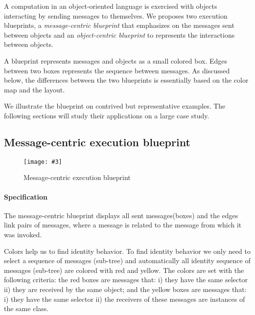 \documentclass{sig-alternate}
\newcommand{\fig}[4]{
	\begin{figure}[#1]
		\centering
		\texttt{[image: \#3]}
		\caption{\label{fig:#3}#4}
	\end{figure}}
\begin{document}
A computation in an object-oriented language is exercised with objects interacting by sending messages to themselves. We proposes two execution blueprints, a \emph{message-centric blueprint} that emphasizes on the messages sent between objects and an \emph{object-centric blueprint} to represents the interactions between objects.

A blueprint represents messages and objects as a small colored box. Edges between two boxes represents the sequence between messages. As discussed below, the differences between the two blueprints is essentially based on the color map and the layout.

We illustrate the blueprint on contrived but representative examples. The following sections will study their applications on a large case study.

%
%
%


\subsection{Message-centric execution blueprint}

\fig{}{0.4}{TreeLayout2}{Message-centric execution blueprint}

\paragraph{Specification}

The message-centric blueprint displays all sent messages(boxes) and the edges link pairs of messages, where a message is related to the message from which it was invoked.

Colors help us to find identity behavior. To find identity behavior we only need to select a sequence of messages (sub-tree) and automatically all identity sequence of messages (sub-tree) are colored with red and yellow. The colors are set with the following criteria: the red boxes are messages that: i) they have the same selector ii) they are received by the same object; and the yellow boxes are messages that: i) they have the same selector ii) the receivers of these messages are instances of the same class.
\end{document}

